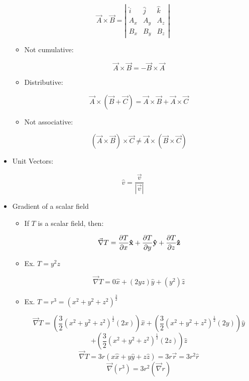 \begin{itemize}
    $$\vec{A}\times\vec{B}=\left|\begin{matrix}\hat{i} & \hat{j} & \hat{k}\\ A_x & A_y & A_z\\ B_x & B_y & B_z\end{matrix}\right|$$

    \begin{itemize}

      \item Not cumulative:

    $$\vec{A}\times\vec{B}=-\vec{B}\times\vec{A}$$

      \item Distributive:

        $$\vec{A}\times(\vec{B}+\vec{C})=\vec{A}\times\vec{B}+\vec{A}\times\vec{C}$$

      \item Not associative:

        $$(\vec{A}\times\vec{B})\times\vec{C}\neq\vec{A}\times(\vec{B}\times\vec{C})$$

    \end{itemize}

  \item Unit Vectors:

    $$\hat{v}=\frac{\vec{v}}{|\vec{v}|}$$

  \item Gradient of a scalar field

    \begin{itemize}

      \item If $T$ is a scalar field, then:

        $$\vec{\nabla}T=\frac{\partial T}{\partial x}\bold{\hat{x}}+\frac{\partial T}{\partial y}\bold{\hat{y}}+\frac{\partial T}{\partial z}\bold{\hat{z}}$$

      \item Ex. $T=y^2z$

        $$\vec{\nabla}T=0\hat{x}+(2yz)\hat{y}+(y^2)\hat{z}$$

      \item Ex. $T=r^3=(x^2+y^2+z^2)^{\frac{3}{2}}$

        $$\vec{\nabla}T=\left(\frac{3}{2}(x^2+y^2+z^2)^{\frac{1}{2}}(2x)\right)\hat{x}+\left(\frac{3}{2}(x^2+y^2+z^2)^{\frac{1}{2}}(2y)\right)\hat{y}$$
        $$+\left(\frac{3}{2}(x^2+y^2+z^2)^{\frac{1}{2}}(2z)\right)\hat{z}$$
        $$\vec{\nabla}T=3r(x\hat{x}+y\hat{y}+z\hat{z})=3r\vec{r}=3r^2\hat{r}$$
        $$\vec{\nabla}(r^3)=3r^2(\vec{\nabla}r)$$


\end{itemize}
\end{itemize}
